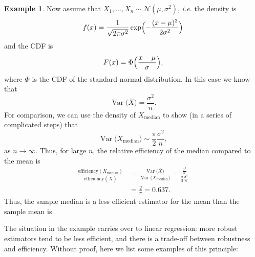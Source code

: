 \documentclass[
  a4paper,
]{article}
\theoremstyle{definition}
\theoremstyle{definition}
\newtheorem{example}{Example}[section]
\theoremstyle{definition}
\theoremstyle{definition}
\theoremstyle{remark}
\begin{document}
\begin{example}
Now assume that \(X_1, \ldots, X_n \sim \mathcal{N}(\mu, \sigma^2)\), \emph{i.e.}
the density is
\begin{equation*}
  f(x)
  = \frac{1}{\sqrt{2\pi\sigma^2}} \exp\Bigl( - \frac{(x-\mu)^2}{2\sigma^2} \Bigr)
\end{equation*}
and the CDF is
\begin{equation*}
  F(x) = \Phi\Bigl( \frac{x - \mu}{\sigma} \Bigr),
\end{equation*}
where \(\Phi\) is the CDF of the standard normal distribution. In this case
we know that
\begin{equation*}
  \mathop{\mathrm{Var}}\bigl( \overline X \bigr)
  = \frac{\sigma^2}{n}.
\end{equation*}
For comparison, we can use the density of \(X_\mathrm{median}\) to show
(in a series of complicated steps) that
\begin{equation*}
  \mathop{\mathrm{Var}}\bigl( X_\mathrm{median} \bigr)
  \sim \frac{\pi}{2} \frac{\sigma^2}{n},
\end{equation*}
as \(n\to\infty\). Thus, for large \(n\), the relative efficiency
of the median compared to the mean is
\begin{align*}
  \frac{\mathrm{efficiency}(X_\mathrm{median})}{\mathrm{efficiency}(\overline{X})}
  &= \frac{\mathop{\mathrm{Var}}\bigl( \overline X \bigr)}{\mathop{\mathrm{Var}}\bigl( X_\mathrm{median} \bigr)}
      = \frac{\frac{\sigma^2}{n}}{\frac{\pi}{2} \frac{\sigma^2}{n}} \\
  &= \frac{2}{\pi}
      = 0.637.
\end{align*}
Thus, the sample median is a less efficient estimator for the mean than
the sample mean is.
\end{example}

The situation in the example carries over to linear regression: more robust
estimators tend to be less efficient, and there is a trade-off between
robustness and efficiency. Without proof, here we list some examples of this
principle:
\end{document}

